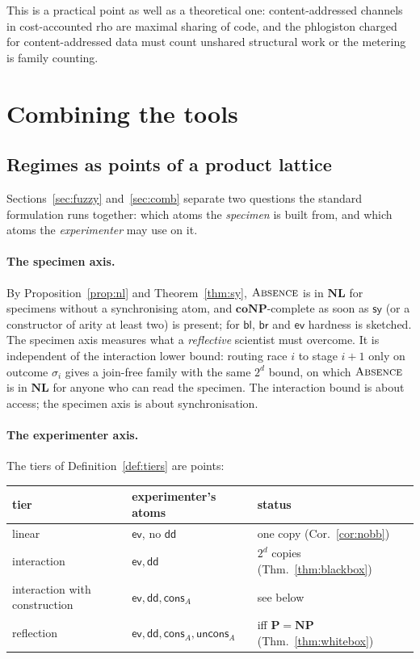 \documentclass[11pt]{article}
\theoremstyle{definition}
\theoremstyle{plain}
\theoremstyle{remark}
\newcommand{\ABS}{\textup{\textsc{Absence}}}
\newcommand{\Pclass}{\mathbf{P}}
\newcommand{\NPclass}{\mathbf{NP}}
\newcommand{\coNP}{\mathbf{coNP}}
\newcommand{\cdd}{\mathsf{dd}}
\newcommand{\csy}{\mathsf{sy}}
\newcommand{\cbl}{\mathsf{bl}}
\newcommand{\cbr}{\mathsf{br}}
\newcommand{\cev}{\mathsf{ev}}
\newcommand{\ccons}{\mathsf{cons}}
\newcommand{\cuncons}{\mathsf{uncons}}
\begin{document}
\noindent
This is a practical point as well as a theoretical one: content-addressed
channels in cost-accounted rho are maximal sharing of code, and the
phlogiston charged for content-addressed data must count unshared
structural work or the metering is family counting.
\section{Combining the tools}\label{sec:combine}

\subsection{Regimes as points of a product lattice}\label{sec:product}

Sections~\ref{sec:fuzzy} and~\ref{sec:comb} separate two questions the
standard formulation runs together: which atoms the \emph{specimen} is
built from, and which atoms the \emph{experimenter} may use on it.

\paragraph{The specimen axis.} By Proposition~\ref{prop:nl} and
Theorem~\ref{thm:sy}, $\ABS$ is in $\mathbf{NL}$ for specimens without a
synchronising atom, and $\coNP$-complete as soon as $\csy$ (or a
constructor of arity at least two) is present; for $\cbl$, $\cbr$ and
$\cev$ hardness is sketched. The specimen axis measures what a
\emph{reflective} scientist must overcome. It is independent of the
interaction lower bound: routing race $i$ to stage $i+1$ only on outcome
$\sigma_i$ gives a join-free family with the same $2^d$ bound, on which
$\ABS$ is in $\mathbf{NL}$ for anyone who can read the specimen. The
interaction bound is about access; the specimen axis is about
synchronisation.

\paragraph{The experimenter axis.} The tiers of
Definition~\ref{def:tiers} are points:
\begin{center}
\begin{tabular}{@{}lll@{}}
\toprule
tier & experimenter's atoms & status \\
\midrule
linear & $\cev$, no $\cdd$ & one copy (Cor.~\ref{cor:nobb}) \\
interaction & $\cev, \cdd$ & $2^d$ copies (Thm.~\ref{thm:blackbox}) \\
interaction with construction & $\cev, \cdd, \ccons_A$ & see below \\
reflection & $\cev, \cdd, \ccons_A, \cuncons_A$ & iff $\Pclass = \NPclass$
(Thm.~\ref{thm:whitebox}) \\
\bottomrule
\end{tabular}
\end{center}
\end{document}
